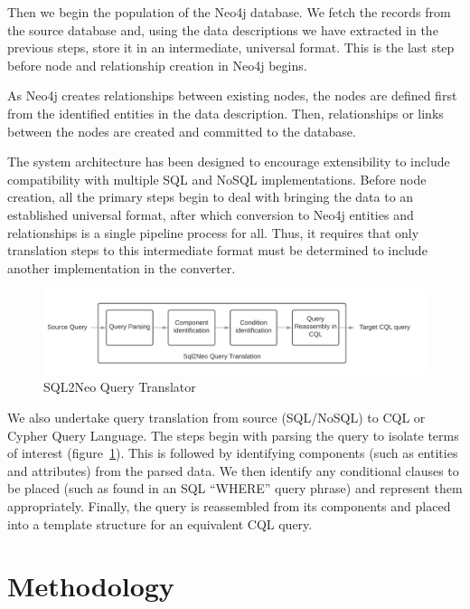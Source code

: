 \documentclass[12pt]{article}
\newcommand{\sectionfontstyle}{\fontsize{16pt}{1em}\usefont{T1}{phv}{b}{n}}
\begin{document}
    Then we begin the population of the Neo4j database. We fetch the records from the source database and, using the data descriptions we have extracted in the previous steps, store it in an intermediate, universal format. This is the last step before node and relationship creation in Neo4j begins.
    
    As Neo4j creates relationships between existing nodes, the nodes are defined first from the identified entities in the data description. Then, relationships or links between the nodes are created and committed to the database.
    
    The system architecture has been designed to encourage extensibility to include compatibility with multiple SQL and NoSQL implementations. Before node creation, all the primary steps begin to deal with bringing the data to an established universal format, after which conversion to Neo4j entities and relationships is a single pipeline process for all. Thus, it requires that only translation steps to this intermediate format must be determined to include another implementation in the converter.
    
    \begin{figure}[htb!]
        \centering
        \includegraphics[width=155mm]{img/sql2neo_query.png}
        \caption{SQL2Neo Query Translator}
        \label{fig:sql2neo_query}
    \end{figure}

    We also undertake query translation from source (SQL/NoSQL) to CQL or Cypher Query Language. The steps begin with parsing the query to isolate terms of interest (figure~\ref{fig:sql2neo_query}). This is followed by identifying components (such as entities and attributes) from the parsed data. We then identify any conditional clauses to be placed (such as found in an SQL ``WHERE'' query phrase) and represent them appropriately. Finally, the query is reassembled from its components and placed into a template structure for an equivalent CQL query.

    \newpage

    \section{\sectionfontstyle Methodology}
\end{document}
